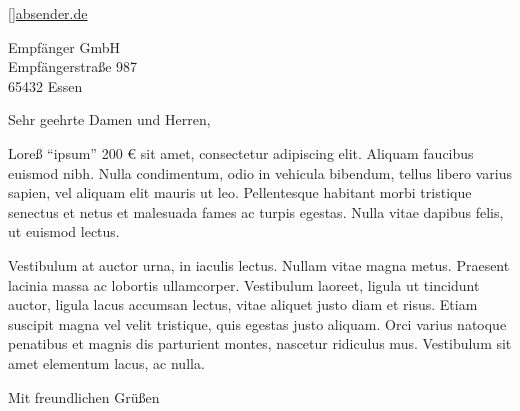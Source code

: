 \documentclass[
	fontsize=12pt,
	parskip=full,
	paper=A4,
	fromphone=false,
	fromfax=false,
	fromemail=false,
	fromurl=false,
	version=last,
]{scrlttr2}
\begin{document}





[]{\href{http://absender.de}{absender.de}}







\begin{letter}{
	Empfänger GmbH\\
	Empfängerstraße 987\\
	65432 Essen
}

\opening{Sehr geehrte Damen und Herren,}

Loreß "`ipsum"' 200 € sit amet, consectetur adipiscing elit. Aliquam faucibus euismod nibh. Nulla condimentum, odio in vehicula bibendum, tellus libero varius sapien, vel aliquam elit mauris ut leo. Pellentesque habitant morbi tristique senectus et netus et malesuada fames ac turpis egestas. Nulla vitae dapibus felis, ut euismod lectus.

Vestibulum at auctor urna, in iaculis lectus. Nullam vitae magna metus. Praesent lacinia massa ac lobortis ullamcorper. Vestibulum laoreet, ligula ut tincidunt auctor, ligula lacus accumsan lectus, vitae aliquet justo diam et risus. Etiam suscipit magna vel velit tristique, quis egestas justo aliquam. Orci varius natoque penatibus et magnis dis parturient montes, nascetur ridiculus mus. Vestibulum sit amet elementum lacus, ac nulla.

\closing{Mit freundlichen Grüßen}




\end{letter}
\end{document}
